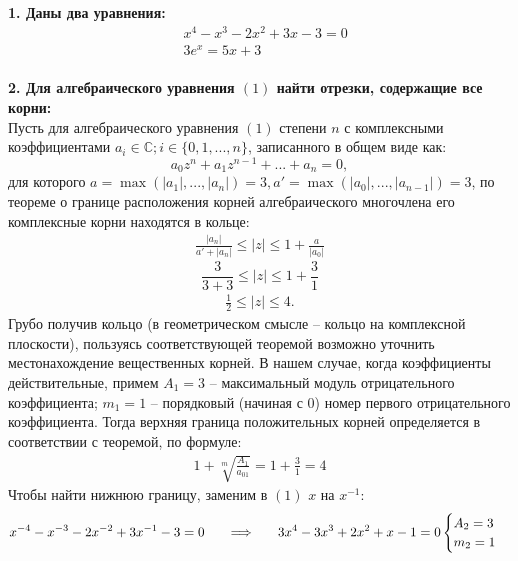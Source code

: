 





\clearpage
{}
\setcounter{page}{2}
{\Large{\textbf{1. Даны два уравнения:}}}
\begin{align}
    &x^4-x^3-2x^2+3x-3=0\\
    &3e^x=5x+3
\end{align}\\

{\Large{\textbf{2. Для алгебраического уравнения $(1)$ найти отрезки, содержащие все корни:}}}\\
Пусть для алгебраического уравнения $(1)$ степени $n$ с комплексными коэффициентами $a_i\in\mathbb{C}; i\in \{0, 1, ..., n\}$, записанного в общем виде как:
\[
    a_0z^n+a_1z^{n-1}+...+a_n=0,
\]
для которого $a=\max(|a_1|,...,|a_n|)=3, a'=\max(|a_0|,...,|a_{n-1}|)=3$, по теореме о границе расположения корней алгебраического многочлена его комплексные корни находятся в кольце:
\begin{align}
    \frac{|a_n|}{a'+|a_n|}\le |z| \le 1+\frac{a}{|a_0|}
\end{align}
\[
    \frac{3}{3+3}\le |z| \le 1+\frac{3}{1}
\]
\begin{align}
    \frac{1}{2}\le |z| \le 4.
\end{align}
Грубо получив кольцо (в геометрическом смысле -- кольцо на комплексной плоскости), пользуясь соответствующей теоремой возможно уточнить местонахождение вещественных корней. В нашем случае, когда коэффициенты действительные, примем $A_1=3$ -- максимальный модуль отрицательного коэффициента; $m_1=1$ -- порядковый (начиная с $0$) номер первого отрицательного коэффициента. Тогда верхняя граница положительных корней определяется в соответствии с теоремой, по формуле:
\begin{align}
    1 + \sqrt[m]{\frac{A_1}{a_{01}}} = 1 +\frac{3}{1} = 4
\end{align}
Чтобы найти нижнюю границу, заменим в $(1)$ $x$ на $x^{-1}$:
\begin{align}
    x^{-4}-x^{-3}-2x^{-2}+3x^{-1}-3=0 \hspace{0.5cm} \implies \hspace{0.5cm}
    3x^4-3x^3+2x^2+x-1=0
    \begin{cases}
        A_2 = 3 \\
        m_2 = 1
    \end{cases}
\end{align}
